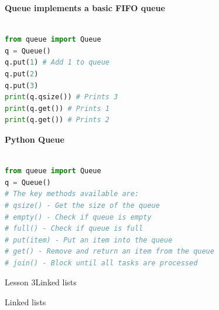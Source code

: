 \documentclass[aspectratio=1610]{beamer}
\begin{document}
\begin{frame}[fragile]
\Large
\textbf{Queue implements a basic FIFO queue}\\~\\
\begin{lstlisting}[language=Python]
from queue import Queue
q = Queue()
q.put(1) # Add 1 to queue
q.put(2)
q.put(3)
print(q.qsize()) # Prints 3
print(q.get()) # Prints 1
print(q.get()) # Prints 2
\end{lstlisting}
\end{frame}



\begin{frame}[fragile]
\Large
\textbf{Python Queue}\\~\\
\begin{lstlisting}[language=Python]
from queue import Queue
q = Queue()
# The key methods available are:
# qsize() - Get the size of the queue
# empty() - Check if queue is empty
# full() - Check if queue is full
# put(item) - Put an item into the queue
# get() - Remove and return an item from the queue
# join() - Block until all tasks are processed
\end{lstlisting}
\end{frame}





\begin{frame}{Lesson 3}{Linked lists}
\begin{center}
\Huge Linked lists
\end{center}
\end{frame}
\end{document}
